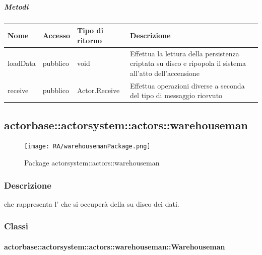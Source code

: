 \documentclass{scalatekids-article}
\begin{document}
\subparagraph{Metodi}

\begin{tabular}{| p{3cm} | p{1.5cm} | p{3.5cm} | p{9cm} |}
  \hline
  Nome & Accesso & Tipo di ritorno & Descrizione\\
  \hline
  loadData & pubblico & void & Effettua la lettura della persistenza criptata su disco e ripopola il sistema all'atto dell'accensione\\
  \hline
  receive & pubblico & Actor.Receive & Effettua operazioni diverse a seconda del tipo di messaggio ricevuto\\
  \hline
\end{tabular}


\subsection{actorbase::actorsystem::actors::warehouseman}
\label{sec:actorbase::actorsystem::actors::warehouseman}

\begin{figure}[H]
  \begin{center}
    \texttt{[image: RA/warehousemanPackage.png]}
    \caption{Package actorsystem::actors::warehouseman}
  \end{center}
\end{figure}

\subsubsection{Descrizione}

 che rappresenta l' che si occuperà della
 su disco dei dati.

\subsubsection{Classi}

\paragraph{actorbase::actorsystem::actors::warehouseman::Warehouseman}
\label{sec:actorbase::actorsystem::actors::warehouseman::Warehouseman}
\end{document}
